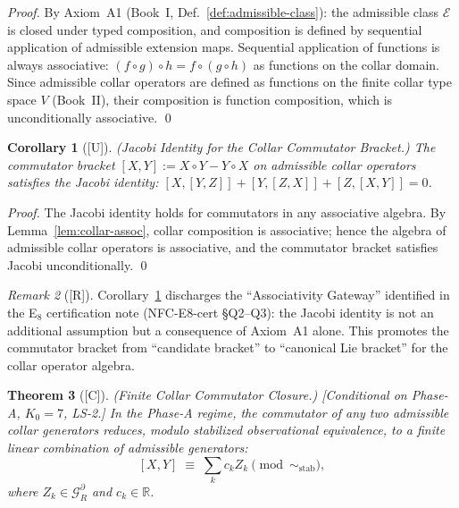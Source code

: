 \documentclass[12pt,oneside]{amsbook}
\theoremstyle{plain}
\newtheorem{theorem}{Theorem}[section]
\newtheorem{corollary}[theorem]{Corollary}
\theoremstyle{definition}
\theoremstyle{remark}
\newtheorem{remark}[theorem]{Remark}
\newcommand{\status}[1]{\textup{[#1]}}
\begin{document}
\begin{proof}
By Axiom~A1 (Book~I, Def.~\ref{def:admissible-class}): the
admissible class $\mathcal{E}$ is closed under typed composition,
and composition is defined by sequential application of admissible
extension maps. Sequential application of functions is always
associative: $(f \circ g) \circ h = f \circ (g \circ h)$ as
functions on the collar domain. Since admissible collar operators
are defined as functions on the finite collar type space $V$
(Book~II), their composition is function composition, which is
unconditionally associative. \qed
\end{proof}

\begin{corollary}[\status{U}]\label{cor:jacobi-holds}
\textup{(Jacobi Identity for the Collar Commutator Bracket.)}
The commutator bracket $[X, Y] := X \circ Y - Y \circ X$ on
admissible collar operators satisfies the Jacobi identity:
$[X,[Y,Z]] + [Y,[Z,X]] + [Z,[X,Y]] = 0$.
\end{corollary}

\begin{proof}
The Jacobi identity holds for commutators in any associative
algebra. By Lemma~\ref{lem:collar-assoc}, collar composition is
associative; hence the algebra of admissible collar operators is
associative, and the commutator bracket satisfies Jacobi
unconditionally. \qed
\end{proof}

\begin{remark}[\status{R}]
Corollary~\ref{cor:jacobi-holds} discharges the ``Associativity
Gateway'' identified in the E$_8$ certification note
(NFC-E8-cert §Q2--Q3): the Jacobi identity is not an additional
assumption but a consequence of Axiom~A1 alone. This promotes
the commutator bracket from ``candidate bracket'' to ``canonical
Lie bracket'' for the collar operator algebra.
\end{remark}

\begin{theorem}[\status{C}]\label{thm:collar-commutator-closure}
\textup{(Finite Collar Commutator Closure.)}
\textup{[Conditional on Phase-A, $K_0=7$, LS-2.]}
In the Phase-A regime, the commutator of any two admissible collar
generators reduces, modulo stabilized observational equivalence,
to a finite linear combination of admissible generators:
\[
 [X, Y] \;\equiv\; \sum_k c_k Z_k \pmod{\sim_{\mathrm{stab}}},
\]
where $Z_k \in \mathcal{G}_R^\partial$ and $c_k \in \mathbb{R}$.
\end{theorem}
\end{document}
